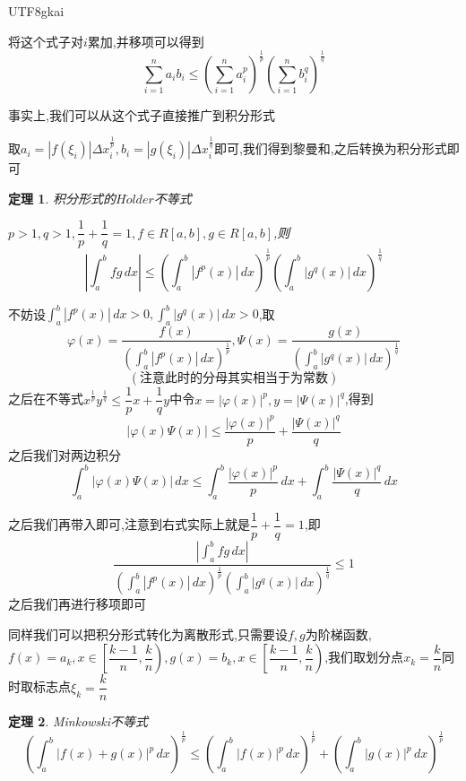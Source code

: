 \documentclass{article}
\newtheorem{theorem}{定理}[subsection]
\newenvironment{cproof}{%
\heiti{证明}\kaishu
}{%
}
\newcommand{\parameter}[1]{\left(#1\right)}
\newcommand{\abs}[1]{\left|#1\right|}
\begin{document}
\begin{CJK}{UTF8}{gkai}
\begin{cproof}
将这个式子对$i$累加,并移项可以得到
\[\sum_{i = 1}^n a_i b_i \leq \parameter{\sum_{i = 1}^n a_i^p}^{\frac{1}{p}} \parameter{\sum_{i = 1}^n b_i^q}^{\frac{1}{q}}\]

\end{cproof}

事实上,我们可以从这个式子直接推广到积分形式

取$a_i = |f(\xi_i)|\Delta x_i^{\frac{1}{p}} , b_i = |g(\xi_i)|\Delta x_i ^\frac{1}{q}$即可,我们得到黎曼和,之后转换为积分形式即可\\

\begin{theorem}

积分形式的$H\ddot{o}lder$不等式

$p > 1,q > 1 , \dfrac{1}{p } + \dfrac{1}{q} = 1,f \in R[a,b],g\in R[a,b]$,则
\[\abs{\int_{a}^{b}fg\, dx} \leq \parameter{\int_{a}^{b}|f^p(x)|\,dx}^{\frac{1}{p}} \parameter{\int_{a}^{b}|g^q(x)|\,dx}^{\frac{1}{q}}\]
\end{theorem}

\begin{cproof}
不妨设$\int_{a}^{b}|f^p(x)|\,dx > 0, \int_{a}^{b}|g^q(x)|\,dx > 0$,取
\[\varphi(x) = \dfrac{f(x)}{\parameter{\int_{a}^{b}|f^p(x)|\,dx}^{\frac{1}{p}}},\varPsi(x) = \dfrac{g(x)}{\parameter{\int_{a}^{b}|g^q(x)|\,dx}^{\frac{1}{q}}}\]
\[(\text{注意此时的分母其实相当于为常数})\]
之后在不等式$x^{\frac{1}{p}} y^{\frac{1}{q}} \leq \dfrac{1}{p}x + \dfrac{1}{q} y$中令$x = |\varphi(x)|^p, y = |\varPsi(x)|^q$,得到
\[|\varphi(x)\varPsi(x)| \leq \dfrac{|\varphi(x)|^p}{p} + \dfrac{|\varPsi(x)|^q}{q}\]
之后我们对两边积分
\[\int_{a}^{b}|\varphi(x)\varPsi(x)|\, dx \leq \int_{a}^{b}\dfrac{|\varphi(x)|^p}{p}\,dx +\int_{a}^{b} \dfrac{|\varPsi(x)|^q}{q}\, dx\]

之后我们再带入即可,注意到右式实际上就是$\dfrac{1}{p } + \dfrac{1}{q} = 1$,即\\
\[ \dfrac{\abs{\int_{a}^{b}fg\, dx}}{\parameter{\int_{a}^{b}|f^p(x)|\,dx}^{\frac{1}{p}}\parameter{\int_{a}^{b}|g^q(x)|\,dx}^{\frac{1}{q}}}\leq 1\]
之后我们再进行移项即可
\end{cproof}

同样我们可以把积分形式转化为离散形式,只需要设$f,g$为阶梯函数,$f(x) = a_k , x\in \left[\dfrac{k - 1}{n}, \dfrac{k}{n}\right),g(x) = b_k , x\in \left[\dfrac{k - 1}{n}, \dfrac{k}{n}\right)$,我们取划分点$x_k = \dfrac{k}{n}$同时取标志点$\xi_k = \dfrac{k}{n}$\\

\begin{theorem}
  Minkowski不等式
  \[\parameter{\int_{a}^{b} \abs{f(x) + g(x)}^p\, dx}^{\frac{1}{p}}  \leq \parameter{\int_{a}^{b}|f(x)|^p\,dx}^{\frac{1}{p}}+\parameter{\int_{a}^{b}|g(x)|^p\,dx}^{\frac{1}{p}}\]
\end{theorem}


\end{CJK}
\end{document}
